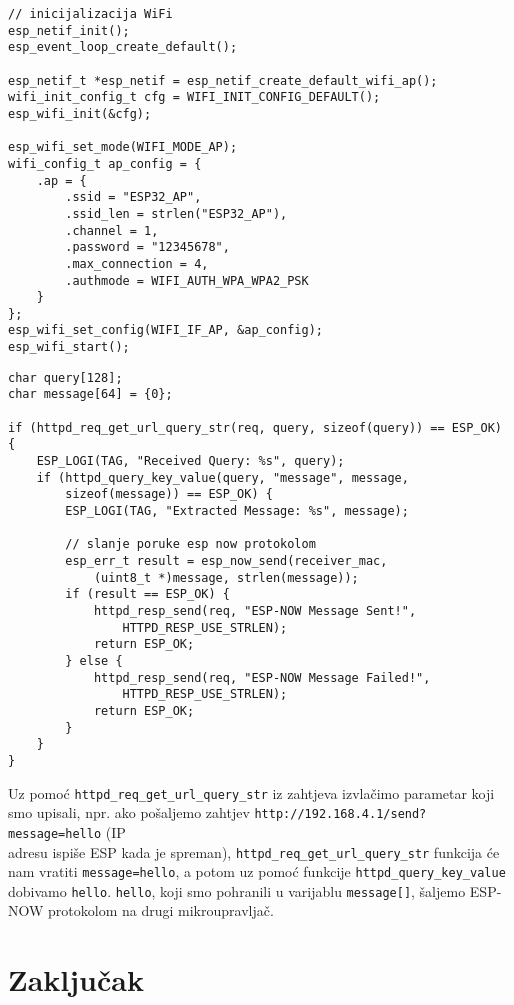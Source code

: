 \documentclass[seminarskirad]{fer}
\begin{document}
\begin{lstlisting}[caption=Kreiranje WiFi AP-a]
// inicijalizacija WiFi
esp_netif_init();
esp_event_loop_create_default();

esp_netif_t *esp_netif = esp_netif_create_default_wifi_ap();
wifi_init_config_t cfg = WIFI_INIT_CONFIG_DEFAULT();
esp_wifi_init(&cfg);

esp_wifi_set_mode(WIFI_MODE_AP);
wifi_config_t ap_config = {
    .ap = {
        .ssid = "ESP32_AP",
        .ssid_len = strlen("ESP32_AP"),
        .channel = 1,
        .password = "12345678",
        .max_connection = 4,
        .authmode = WIFI_AUTH_WPA_WPA2_PSK
    }
};
esp_wifi_set_config(WIFI_IF_AP, &ap_config);
esp_wifi_start();
\end{lstlisting}

\begin{lstlisting}[caption=\textit{Handler} za http zahtjev]
char query[128];
char message[64] = {0};
    
if (httpd_req_get_url_query_str(req, query, sizeof(query)) == ESP_OK) {
    ESP_LOGI(TAG, "Received Query: %s", query);
    if (httpd_query_key_value(query, "message", message, 
        sizeof(message)) == ESP_OK) {
        ESP_LOGI(TAG, "Extracted Message: %s", message);

        // slanje poruke esp now protokolom
        esp_err_t result = esp_now_send(receiver_mac, 
            (uint8_t *)message, strlen(message));
        if (result == ESP_OK) {
            httpd_resp_send(req, "ESP-NOW Message Sent!", 
                HTTPD_RESP_USE_STRLEN);
            return ESP_OK;
        } else {
            httpd_resp_send(req, "ESP-NOW Message Failed!", 
                HTTPD_RESP_USE_STRLEN);
            return ESP_OK;
        }
    }
}
\end{lstlisting}

Uz pomoć \verb|httpd_req_get_url_query_str| iz zahtjeva izvlačimo parametar koji smo upisali, npr. ako pošaljemo zahtjev \verb|http://192.168.4.1/send?message=hello| (IP \\ adresu ispiše ESP kada je spreman), \verb|httpd_req_get_url_query_str| funkcija će nam vratiti \verb|message=hello|, a potom uz pomoć funkcije \verb|httpd_query_key_value| dobivamo \verb|hello|. \verb|hello|, koji smo pohranili u varijablu \verb|message[]|, šaljemo ESP-NOW protokolom na drugi mikroupravljač.   


\chapter{Zaključak}
\label{pog:zakljucak}
\end{document}

